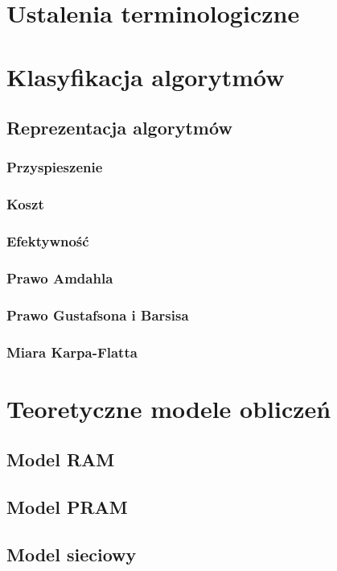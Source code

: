 \section{Ustalenia terminologiczne}


\newpage

\section{Klasyfikacja algorytmów}


\subsection{Reprezentacja algorytmów}



\subsubsection{Przyspieszenie}


\subsubsection{Koszt}


\subsubsection{Efektywność}


\subsubsection{Prawo Amdahla}


\subsubsection{Prawo Gustafsona i Barsisa}


\subsubsection{Miara Karpa-Flatta}


\newpage

\section{Teoretyczne modele obliczeń}

\subsection{Model RAM}


\label{subsec:PRAM}
\subsection{Model PRAM}


\subsection{Model sieciowy}

